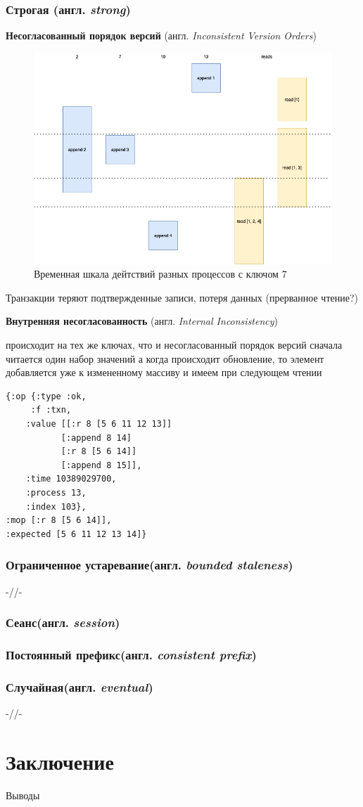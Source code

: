 \documentclass[12pt,  openany]{book}
\begin{document}
\subsection{Строгая (англ.  \textit{strong})}
\textbf{Несогласованный порядок версий} (англ. \textit{Inconsistent Version Orders})\par
\begin{figure}[h!]
  \caption{Временная шкала дейтствий разных процессов с ключом 7}
  \includegraphics[scale=0.4]{strong-internal.png}
\end{figure}

Транзакции теряют подтвержденные записи, потеря данных (прерванное чтение?)


\textbf{Внутренняя несогласованность} (англ. \textit{Internal Inconsistency})\par
происходит на тех же ключах, что и несогласованный порядок версий
сначала читается один набор значений
а когда происходит обновление, то элемент добавляется уже к измененному массиву
и имеем при следующем чтении 
\begin{lstlisting}[caption={Пример транзакции, демонстрирующей внутреннюю несогласованность}]
{:op {:type :ok,
	 :f :txn,
	:value [[:r 8 [5 6 11 12 13]]
		   [:append 8 14]
		   [:r 8 [5 6 14]]
		   [:append 8 15]],
	:time 10389029700,
	:process 13,
	:index 103},
:mop [:r 8 [5 6 14]],
:expected [5 6 11 12 13 14]}
\end{lstlisting}

\subsection{Ограниченное устаревание(англ.  \textit{bounded staleness})}
-//-
\subsection{Сеанс(англ.  \textit{session})}
\subsection{Постоянный префикс(англ.  \textit{consistent prefix})}
\subsection{Случайная(англ.  \textit{eventual})}
-//-
\chapter{Заключение}
Выводы



\end{document}
